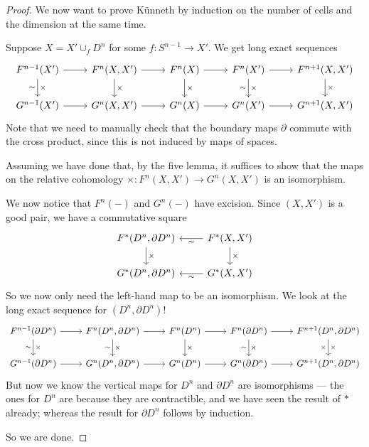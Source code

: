 \documentclass[a4paper]{article}
\begin{document}
\begin{proof}
  We now want to prove K\"unneth by induction on the number of cells and the dimension at the same time.

  Suppose $X = X' \cup_f D^n$ for some $f:S^{n - 1} \to X'$. We get long exact sequences
  \[
    \begin{tikzcd}
      F^{n - 1}(X') \ar[r] \ar[d, "\times", "\sim"'] & F^n(X, X') \ar[r] \ar[d, "\times"] & F^n(X) \ar[r] \ar[d, "\times"] & F^n(X') \ar[r] \ar[d, "\times", "\sim"'] & F^{n + 1}(X, X') \ar[d, "\times"]\\
      G^{n - 1}(X') \ar[r] & G^n(X, X') \ar[r] & G^n(X) \ar[r] & G^n(X') \ar[r] & G^{n + 1}(X, X')
    \end{tikzcd}
  \]
  Note that we need to manually check that the boundary maps $\partial$ commute with the cross product, since this is not induced by maps of spaces.

  Assuming we have done that, by the five lemma, it suffices to show that the maps on the relative cohomology $\times: F^n(X, X') \to G^n(X, X')$ is an isomorphism.

  We now notice that $F^n(-)$ and $G^n(-)$ have excision. Since $(X, X')$ is a good pair, we have a commutative square
  \[
    \begin{tikzcd}
      F^*(D^n, \partial D^n) \ar[d, "\times"] & F^*(X, X') \ar[l, "\sim"] \ar[d, "\times"] \\
      G^*(D^n, \partial D^n) & G^*(X, X') \ar[l, "\sim"]
    \end{tikzcd}
  \]
  So we now only need the left-hand map to be an isomorphism. We look at the long exact sequence for $(D^n, \partial D^n)$!
  \[
    \begin{tikzcd}
      F^{n - 1}(\partial D^n) \ar[r] \ar[d, "\times", "\sim"'] & F^n(D^n, \partial D^n) \ar[r] \ar[d, "\times", "\sim"'] & F^n(D^n) \ar[r] \ar[d, "\times"] & F^n(\partial D^n) \ar[r] \ar[d, "\times", "\sim"'] & F^{n + 1}(D^n, \partial D^n) \ar[d, "\times", "\times"']\\
      G^{n - 1}(\partial D^n) \ar[r] & G^n(D^n, \partial D^n) \ar[r] & G^n(D^n) \ar[r] & G^n(\partial D^n) \ar[r] & G^{n + 1}(D^n, \partial D^n)
    \end{tikzcd}
  \]
  But now we know the vertical maps for $D^n$ and $\partial D^n$ are isomorphisms --- the ones for $D^n$ are because they are contractible, and we have seen the result of $*$ already; whereas the result for $\partial D^n$ follows by induction.

  So we are done.
\end{proof}
\end{document}
